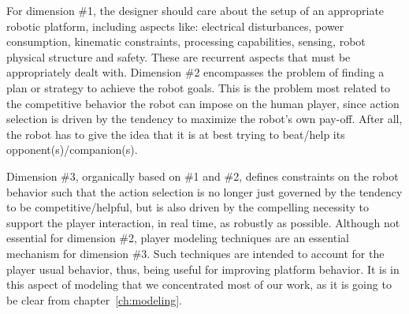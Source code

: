 For dimension \#1, the designer should care about the setup of an appropriate robotic platform, including aspects like: electrical disturbances, power consumption, kinematic constraints, processing capabilities, sensing, robot physical structure and safety. These are recurrent aspects that must be appropriately dealt with. 
Dimension \#2 encompasses the problem of finding a plan or strategy to achieve the robot goals. This is the problem most related to the competitive behavior the robot can impose on the human player, since action selection is driven by the tendency to maximize the robot's own pay-off. After all, the robot has to give the idea that it is at best trying to beat/help its opponent(s)/companion(s).

Dimension \#3, organically based on \#1 and \#2, defines constraints on the robot behavior such that the action selection is no longer just governed by the tendency to be competitive/helpful, but is also driven by the compelling necessity to support the player interaction, in real time, as robustly as possible. Although not essential for dimension \#2, player modeling techniques are an essential mechanism for dimension \#3. Such techniques are intended to account for the player usual behavior, thus, being useful for improving platform behavior. It is in this aspect of modeling that we concentrated most of our work, as it is going to be clear from chapter~\ref{ch:modeling}.




